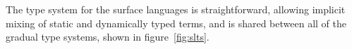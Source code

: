 \documentclass[runnningheads]{tex/llncs}
\begin{document}
The type system for the surface languages is straightforward, allowing implicit
mixing of static and dynamically typed terms, and is shared between all of the
gradual type systems, shown in figure~\ref{fig:slts}.


\begin{figure}[hb]
  
  \hrulefill  \footnotesize
  
  \hspace{-.5cm}\begin{mathpar}






\end{mathpar}
\end{figure}
\end{document}
